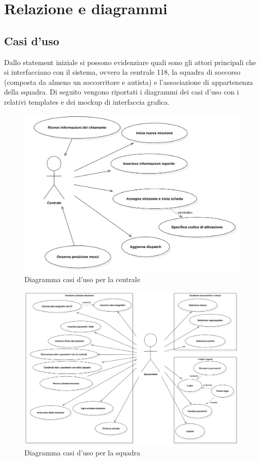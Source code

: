 \documentclass{article}
\begin{document}
    \section{Relazione e diagrammi}
    \subsection{Casi d'uso}
    Dallo statement iniziale si possono evidenziare quali sono gli attori principali che si interfacciano con il sistema, ovvero la centrale 118, la squadra di soccorso (composta da almeno un soccorritore e autista) e l'associazione di appartenenza della squadra.
    Di seguito vengono riportati i diagrammi dei casi d'uso con i relativi templates e dei mockup di interfaccia grafica.

    \begin{figure}
        \centering
        \includegraphics[width=5in]{diagrams/png/uc-centrale.png}
        \caption{Diagramma casi d'uso per la centrale}
        \label{fig:uc-controlcenter}
    \end{figure}
    \begin{figure}
        \centering
        \includegraphics[width=6in]{diagrams/png/uc-soccorritore.png}
        \caption{Diagramma casi d'uso per la squadra}
        \label{fig:uc-rescueteam}
    \end{figure}
\end{document}
